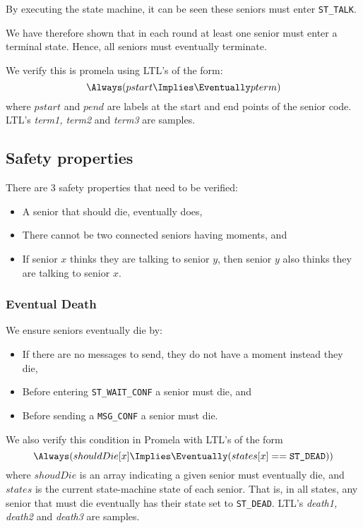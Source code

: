 \documentclass[12pt,a4paper]{scrartcl}
\begin{document}
By executing the state machine, it can be seen these seniors must enter \texttt{ST\_TALK}.

We have therefore shown that in each round at least one senior must enter a terminal state.
Hence, all seniors must eventually terminate.

We verify this is promela using LTL's of the form:
\begin{equation}
    \Always(pstart \Implies \Eventually pterm)
\label{eq:ltl-term}
\end{equation}
where $pstart$ and $pend$ are labels at the start and end points of the senior code.
LTL's \emph{term1, term2} and \emph{term3} are samples.

\subsection{Safety properties}
There are 3 safety properties that need to be verified:
\begin{itemize}
    \item A senior that should die, eventually does,
    \item There cannot be two connected seniors having moments, and
    \item If senior $x$ thinks they are talking to senior $y$, then senior $y$ also thinks they are talking to senior $x$.
\end{itemize}

\subsubsection{Eventual Death}
We ensure seniors eventually die by:
\begin{itemize}
    \item If there are no messages to send, they do not have a moment instead they die,
    \item Before entering \texttt{ST\_WAIT\_CONF} a senior must die, and
    \item Before sending a \texttt{MSG\_CONF} a senior must die.
\end{itemize}

We also verify this condition in Promela with LTL's of the form
\begin{equation*}
    \Always(shouldDie[x] \Implies \Eventually(states[x] == \texttt{ST\_DEAD}) )
\label{eq:ltl-death}
\end{equation*}
where $shoudDie$ is an array indicating a given senior must eventually die, and $states$ is the current state-machine state of each senior.
That is, in all states, any senior that must die eventually has their state set to \texttt{ST\_DEAD}.
LTL's \emph{death1, death2} and \emph{death3} are samples.
\end{document}
